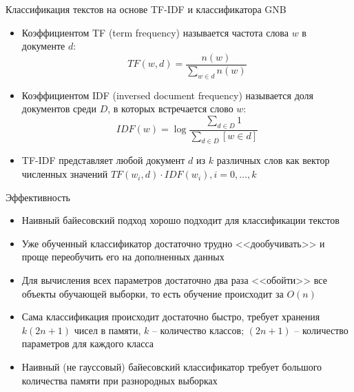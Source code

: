 \documentclass[compress,red,unicode]{beamer}
\begin{document}
\begin{frame}{}

\begin{block}{}
\scriptsize

\end{block}

\end{frame}

\begin{frame}{Классификация текстов на основе TF-IDF и классификатора GNB}
\begin{itemize}
	\item Коэффициентом TF (term frequency) называется частота слова $w$ в документе $d$:
$$
TF (w,d) = \frac{n(w)}{\sum_{w \in d} n(w)}
$$
	\item Коэффициентом IDF (inversed document frequency) называется доля документов среди $D$, в которых встречается слово $w$:
$$
IDF (w) = \log \frac{\sum_{d\in D} 1}{\sum_{d\in D} [w\in d]}
$$
	\item TF-IDF представляет любой документ $d$ из $k$ различных слов как вектор численных значений $TF(w_i,d)\cdot IDF(w_i), i=0,\dots,k $

\end{itemize}
\end{frame}

%
%
%


\begin{frame}{Эффективность}
\begin{itemize}
	\item Наивный байесовский подход хорошо подходит для классификации текстов
	\item Уже обученный классификатор достаточно трудно <<дообучивать>> и проще переобучить его на дополненных данных
	\item Для вычисления всех параметров достаточно два раза <<обойти>> все объекты обучающей выборки, то есть обучение происходит за $O(n)$
	\item Сама классификация происходит достаточно быстро, требует хранения $k(2n+1)$ чисел в памяти, $k$ -- количество классов; $(2n+1)$ -- количество параметров для каждого класса
	\item Наивный (не гауссовый) байесовский классификатор требует большого количества памяти при разнородных выборках

\end{itemize}
\end{frame}
\end{document}
